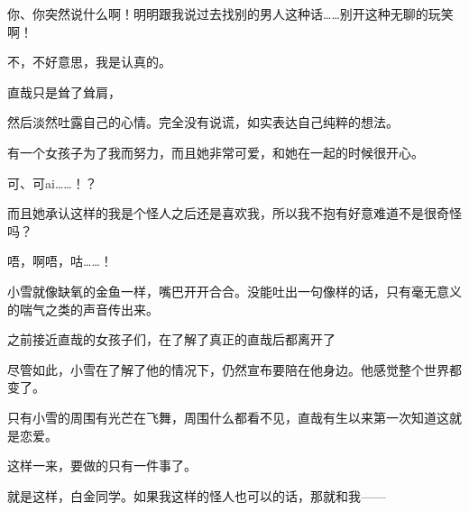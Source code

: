 你、你突然说什么啊！明明跟我说过去找别的男人这种话……别开这种无聊的玩笑啊！

不，不好意思，我是认真的。

直哉只是耸了耸肩，

然后淡然吐露自己的心情。完全没有说谎，如实表达自己纯粹的想法。

有一个女孩子为了我而努力，而且她非常可爱，和她在一起的时候很开心。

可、可ai……！？

而且她承认这样的我是个怪人之后还是喜欢我，所以我不抱有好意难道不是很奇怪吗？

唔，啊唔，咕……！

小雪就像缺氧的金鱼一样，嘴巴开开合合。没能吐出一句像样的话，只有毫无意义的喘气之类的声音传出来。

之前接近直哉的女孩子们，在了解了真正的直哉后都离开了

尽管如此，小雪在了解了他的情况下，仍然宣布要陪在他身边。他感觉整个世界都变了。

只有小雪的周围有光芒在飞舞，周围什么都看不见，直哉有生以来第一次知道这就是恋爱。

这样一来，要做的只有一件事了。

就是这样，白金同学。如果我这样的怪人也可以的话，那就和我——

